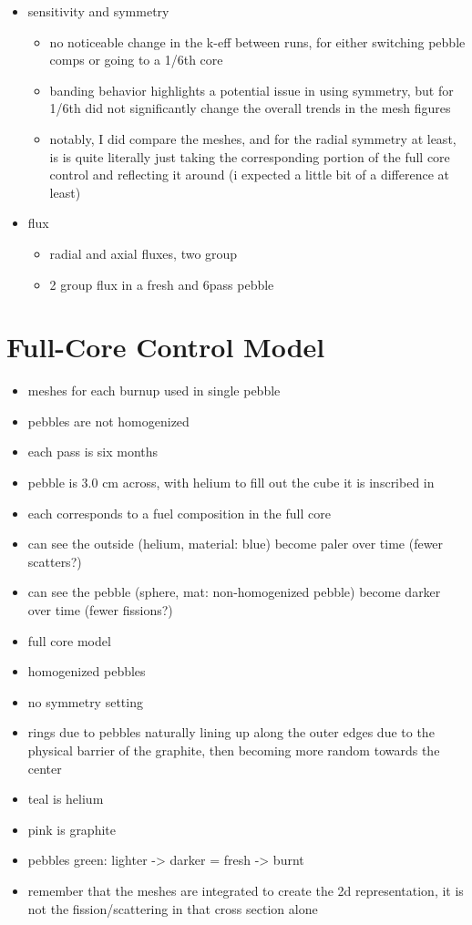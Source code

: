 \begin{itemize}
\item sensitivity and symmetry
	\begin{itemize}
	\item no noticeable change in the k-eff between runs, for either switching pebble comps or going to a 1/6th core
	\item banding behavior highlights a potential issue in using symmetry, but for 1/6th did not significantly change the overall trends in the mesh figures
	\item notably, I did compare the meshes, and for the radial symmetry at least, is is quite literally just taking the corresponding portion of the full core control and reflecting it around (i expected a little bit of a difference at least)
	\end{itemize}
\item flux
	\begin{itemize}
	\item radial and axial fluxes, two group
	\item 2 group flux in a fresh and 6pass pebble
	\end{itemize}
	
\end{itemize}
\section{Full-Core Control Model}


\begin{itemize}
\item meshes for each burnup used in single pebble
\item pebbles are not homogenized
\item each pass is six months
\item pebble is 3.0 cm across, with helium to fill out the cube it is inscribed in
\item each corresponds to a fuel composition in the full core
\item can see the outside (helium, material: blue) become paler over time (fewer scatters?)
\item can see the pebble (sphere, mat: non-homogenized pebble) become darker over time (fewer fissions?)
\end{itemize}


\begin{itemize}
\item full core model
\item homogenized pebbles
\item no symmetry setting
\item rings due to pebbles naturally lining up along the outer edges due to the physical barrier of the graphite, then becoming more random towards the center
\item teal is helium
\item pink is graphite
\item pebbles green: lighter -> darker = fresh -> burnt
\item remember that the meshes are integrated to create the 2d representation, it is not the fission/scattering in that cross section alone
\end{itemize}

